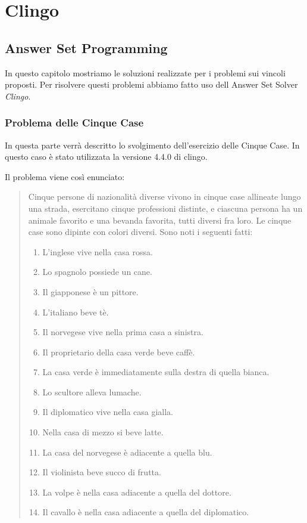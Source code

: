 \part{Clingo}

\chapter{Answer Set Programming}
In questo capitolo mostriamo le soluzioni realizzate per i problemi sui vincoli
proposti. Per risolvere questi problemi abbiamo fatto uso dell Answer Set Solver \emph{Clingo}.

\section{Problema delle Cinque Case}
In questa parte verrà descritto lo svolgimento dell'esercizio delle Cinque Case. In questo caso è stato utilizzata la versione 4.4.0 di clingo.

Il problema viene così enunciato:

\small{\begin{quote}
    Cinque persone di nazionalità diverse vivono in cinque case allineate lungo una
    strada, esercitano cinque professioni distinte, e ciascuna persona ha un animale favorito e una
    bevanda favorita, tutti diversi fra loro. Le cinque case sono dipinte con colori diversi. Sono noti i
    seguenti fatti:
    \begin{enumerate}
        \item{L'inglese vive nella casa rossa.}
        \item{Lo spagnolo possiede un cane.}
        \item{Il giapponese è un pittore.}
        \item{L'italiano beve tè.}
        \item{Il norvegese vive nella prima casa a sinistra.}
        \item{Il proprietario della casa verde beve caffè.}
        \item{La casa verde è immediatamente sulla destra di quella bianca.}
        \item{Lo scultore alleva lumache.}
        \item{Il diplomatico vive nella casa gialla.}
        \item{Nella casa di mezzo si beve latte.}
        \item{La casa del norvegese è adiacente a quella blu.}
        \item{Il violinista beve succo di frutta.}
        \item{La volpe è nella casa adiacente a quella del dottore.}
        \item{Il cavallo è nella casa adiacente a quella del diplomatico.}
    \end{enumerate}
\end{quote}}

